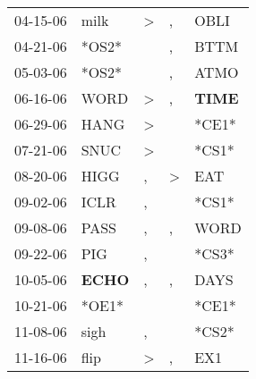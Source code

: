 \begin{supertabular}{p{0.07\textwidth}p{0.06\textwidth}p{0.02\textwidth}p{0.02\textwidth}p{0.06\textwidth}}
          04-15-06\textsuperscript{} &           milk\textsuperscript{} &     \textgreater &                , &           OBLI\textsuperscript{} \\
          04-21-06\textsuperscript{} &                            *OS2* &                  &                , &           BTTM\textsuperscript{} \\
          05-03-06\textsuperscript{} &                            *OS2* &                  &                , &           ATMO\textsuperscript{} \\
          06-16-06\textsuperscript{} &           WORD\textsuperscript{} &     \textgreater &                , &  \textbf{TIME\textsuperscript{}} \\
          06-29-06\textsuperscript{} &           HANG\textsuperscript{} &     \textgreater &                  &                            *CE1* \\
          07-21-06\textsuperscript{} &           SNUC\textsuperscript{} &     \textgreater &                  &                            *CS1* \\
          08-20-06\textsuperscript{} &           HIGG\textsuperscript{} &                , &     \textgreater &            EAT\textsuperscript{} \\
          09-02-06\textsuperscript{} &           ICLR\textsuperscript{} &                , &                  &                            *CS1* \\
          09-08-06\textsuperscript{} &           PASS\textsuperscript{} &                , &                , &           WORD\textsuperscript{} \\
          09-22-06\textsuperscript{} &            PIG\textsuperscript{} &                , &                  &                            *CS3* \\
          10-05-06\textsuperscript{} &  \textbf{ECHO\textsuperscript{}} &                , &                , &           DAYS\textsuperscript{} \\
          10-21-06\textsuperscript{} &                            *OE1* &                  &                  &                            *CE1* \\
          11-08-06\textsuperscript{} &           sigh\textsuperscript{} &                , &                  &                            *CS2* \\
          11-16-06\textsuperscript{} &           flip\textsuperscript{} &     \textgreater &                , &            EX1\textsuperscript{} \\

\end{supertabular}
